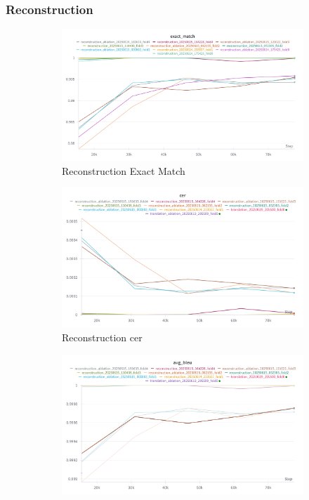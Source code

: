 \documentclass[letterpaper]{article} %
\begin{document}
\subsubsection{Reconstruction}
\begin{figure}[ht]
    \centering
    \begin{subfigure}[b]{0.45\textwidth}
        \centering
        \includegraphics[width=\textwidth]{figures/recon_exact_match.png}
        \caption{Reconstruction Exact Match}
        \label{fig:recon_exact_match}
    \end{subfigure}
    \begin{subfigure}[b]{0.45\textwidth}
        \centering
        \includegraphics[width=\textwidth]{figures/recon_cer.png}
        \caption{Reconstruction cer}
        \label{fig:recon_cer}
    \end{subfigure}
    \begin{subfigure}[b]{0.45\textwidth}
        \centering
        \includegraphics[width=\textwidth]{figures/recon_bleu.png}

\end{subfigure}
\end{figure}
\end{document}
